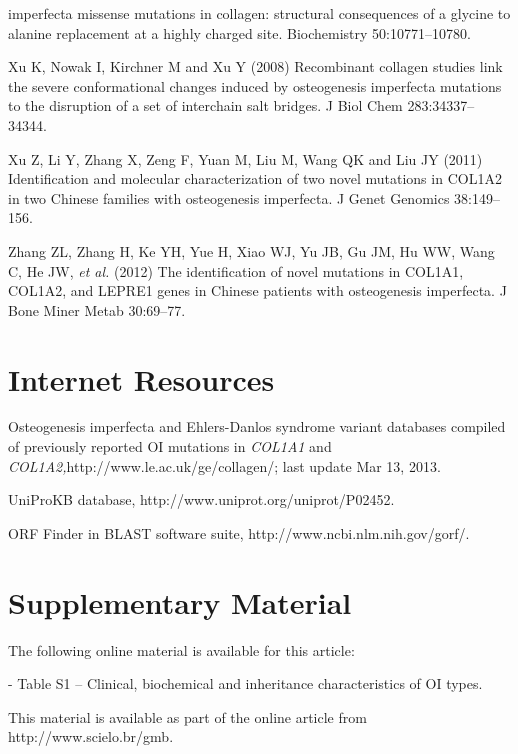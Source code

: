                     imperfecta missense mutations in collagen: structural consequences of a glycine
                    to alanine replacement at a highly charged site. Biochemistry
                    50:10771–10780.
\par Xu K, Nowak I, Kirchner M and Xu Y (2008) Recombinant collagen
                    studies link the severe conformational changes induced by osteogenesis
                    imperfecta mutations to the disruption of a set of interchain salt bridges. J
                    Biol Chem 283:34337–34344.
\par Xu Z, Li Y, Zhang X, Zeng F, Yuan M, Liu M, Wang QK and Liu JY
                    (2011) Identification and molecular characterization of two novel mutations in
                    COL1A2 in two Chinese families with osteogenesis imperfecta. J Genet Genomics
                    38:149–156.
\par Zhang ZL, Zhang H, Ke YH, Yue H, Xiao WJ, Yu JB, Gu JM, Hu WW, Wang
                    C, He JW, \textit{et al.} (2012) The identification of novel mutations
                    in COL1A1, COL1A2, and LEPRE1 genes in Chinese patients with osteogenesis
                    imperfecta. J Bone Miner Metab 30:69–77.
\section*{Internet Resources}
\par Osteogenesis imperfecta and Ehlers-Danlos syndrome variant databases
                    compiled of previously reported OI mutations in \textit{COL1A1} and
                        \textit{COL1A2,}http://www.le.ac.uk/ge/collagen/; last update Mar 13,
                    2013.
\par UniProKB database, http://www.uniprot.org/uniprot/P02452.
\par ORF Finder in BLAST software suite, http://www.ncbi.nlm.nih.gov/gorf/.

\section*{Supplementary Material}
\par The following online material is available for this article: \par - Table S1 – Clinical, biochemical and inheritance characteristics of
                                OI types.
\par This material is available as part of the online article from http://www.scielo.br/gmb.


